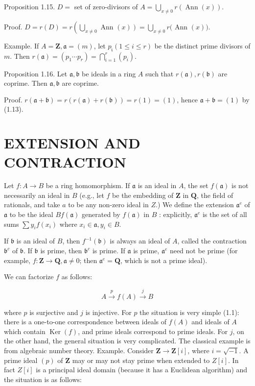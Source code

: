 \documentclass{standalone}
\theoremstyle{definition}
\theoremstyle{remark}
\begin{document}
Proposition 1.15. $D=$ set of zero-divisors of $A=\bigcup_{x \neq 0} r(\operatorname{Ann}(x))$.

Proof. $D=r(D)=r\left(\bigcup_{x \neq 0}\right.$ Ann $\left.(x)\right)=\bigcup_{x \neq 0} r($ Ann $(x))$.

Example. If $A=\mathbf{Z}, \mathfrak{a}=(m)$, let $p_{\mathfrak{i}}(1 \leqslant i \leqslant r)$ be the distinct prime divisors of $m$. Then $r(\mathfrak{a})=\left(p_{1} \cdots p_{r}\right)=\bigcap_{i=1}^{r}\left(p_{i}\right)$.

Proposition 1.16. Let $\mathfrak{a}, \mathfrak{b}$ be ideals in a ring $A$ such that $r(\mathfrak{a}), r(\mathfrak{b})$ are coprime. Then $\mathfrak{a}, \mathfrak{b}$ are coprime.

Proof. $r(\mathfrak{a}+\mathfrak{b})=r(r(\mathfrak{a})+r(\mathfrak{b}))=r(1)=(1)$, hence $\mathfrak{a}+\mathfrak{b}=(1)$ by (1.13).

\section{EXTENSION AND CONTRACTION}
Let $f: A \rightarrow B$ be a ring homomorphism. If $\mathfrak{a}$ is an ideal in $A$, the set $f(\mathfrak{a})$ is not necessarily an ideal in $B$ (e.g., let $f$ be the embedding of $\mathbf{Z}$ in $\mathbf{Q}$, the field of rationals, and take $a$ to be any non-zero ideal in $Z$.) We define the extension $\mathfrak{a}^{e}$ of $\mathfrak{a}$ to be the ideal $B f(\mathfrak{a})$ generated by $f(\mathfrak{a})$ in $B$ : explicitly, $\mathfrak{a}^{e}$ is the set of all sums $\sum y_{i} f\left(x_{i}\right)$ where $x_{i} \in \mathfrak{a}, y_{i} \in B$.

If $\mathfrak{b}$ is an ideal of $B$, then $f^{-1}(\mathfrak{b})$ is always an ideal of $A$, called the contraction $\mathfrak{b}^{c}$ of $\mathfrak{b}$. If $\mathfrak{b}$ is prime, then $\mathfrak{b}^{c}$ is prime. If $\mathfrak{a}$ is prime, $\mathfrak{a}^{e}$ need not be prime (for example, $f: \mathbf{Z} \rightarrow \mathbf{Q}, \mathfrak{a} \neq 0$; then $\mathfrak{a}^{e}=\mathbf{Q}$, which is not a prime ideal).

We can factorize $f$ as follows:

\[
A \stackrel{p}{\rightarrow} f(A) \stackrel{j}{\rightarrow} B
\]

where $p$ is surjective and $j$ is injective. For $p$ the situation is very simple (1.1): there is a one-to-one correspondence between ideals of $f(A)$ and ideals of $A$ which contain $\operatorname{Ker}(f)$, and prime ideals correspond to prime ideals. For $j$, on the other hand, the general situation is very complicated. The classical example is from algebraic number theory. Example. Consider $\mathbf{Z} \rightarrow \mathbf{Z}[i]$, where $i=\sqrt{-1}$. A prime ideal $(p)$ of $\mathbf{Z}$ may or may not stay prime when extended to $Z[i]$. In fact $Z[i]$ is a principal ideal domain (because it has a Euclidean algorithm) and the situation is as follows:
\end{document}
